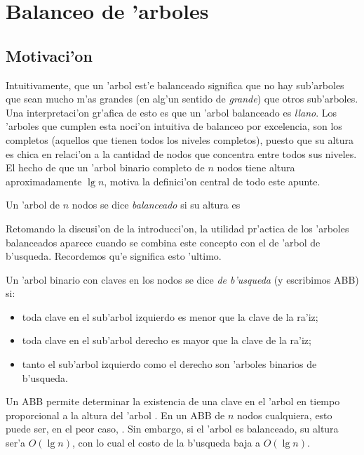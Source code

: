 \section{Balanceo de 'arboles}

\subsection{Motivaci'on}

Intuitivamente, que un 'arbol est'e balanceado significa que no hay sub'arboles que sean mucho m'as grandes (en alg'un sentido de \textit{grande}) que otros sub'arboles. Una interpretaci'on gr'afica de esto es que un 'arbol balanceado es \textit{llano}. Los 'arboles que cumplen esta noci'on intuitiva de balanceo por excelencia, son los completos (aquellos que tienen todos los niveles completos), puesto que su altura es chica en relaci'on a la cantidad de nodos que concentra entre todos sus niveles. El hecho de que un 'arbol binario completo de $n$ nodos tiene altura aproximadamente $\lg n$, motiva la definici'on central de todo este apunte.

\begin{defi}
Un 'arbol de $n$ nodos se dice \textit{balanceado} si su altura es 
\end{defi}

Retomando la discusi'on de la introducci'on, la utilidad pr'actica de los 'arboles balanceados aparece cuando se combina este concepto con el de 'arbol de b'usqueda. Recordemos qu'e significa esto 'ultimo.

\begin{defi}
Un 'arbol binario con claves en los nodos se dice \textit{de b'usqueda} (y escribimos ABB) si:
\begin{itemize}
	\item toda clave en el sub'arbol izquierdo es menor que la clave de la ra'iz;
	\item toda clave en el sub'arbol derecho es mayor que la clave de la ra'iz;
	\item tanto el sub'arbol izquierdo como el derecho son 'arboles binarios de b'usqueda. 
\end{itemize}
\end{defi}

Un ABB permite determinar la existencia de una clave en el 'arbol en tiempo proporcional a la altura del 'arbol \cite{cormen01}. En un ABB de $n$ nodos cualquiera, esto puede ser, en el peor caso, . Sin embargo, si el 'arbol es balanceado, su altura ser'a $O(\lg n)$, con lo cual el costo de la b'usqueda baja a $O(\lg n)$.

